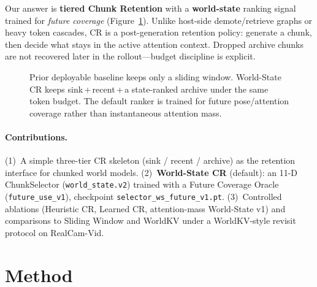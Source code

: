 \documentclass{article}
\newcommand{\method}{World-State CR}
\begin{document}
Our answer is \textbf{tiered Chunk Retention} with a
\textbf{world-state} ranking signal trained for \emph{future coverage}
(Figure~\ref{fig:overview}).  Unlike host-side demote/retrieve graphs or
heavy token cascades, CR is a post-generation retention policy: generate a
chunk, then decide what stays in the active attention context.  Dropped
archive chunks are not recovered later in the rollout---budget discipline
is explicit.

\begin{figure}[t]
  \centering
  \caption{Prior deployable baseline keeps only a sliding window.
  \method{} keeps sink\,+\,recent\,+\,a state-ranked archive under the same
  token budget.  The default ranker is trained for future pose/attention
  coverage rather than instantaneous attention mass.}
  \label{fig:overview}
\end{figure}

\paragraph{Contributions.}
(1)~A simple three-tier CR skeleton (sink / recent / archive) as the
retention interface for chunked world models.
(2)~\textbf{World-State CR} (default): an 11-D ChunkSelector
(\texttt{world\_state.v2}) trained with a Future Coverage Oracle
(\texttt{future\_use\_v1}), checkpoint \texttt{selector\_ws\_future\_v1.pt}.
(3)~Controlled ablations (Heuristic CR, Learned CR, attention-mass
World-State v1) and comparisons to Sliding Window and WorldKV under a
WorldKV-style revisit protocol on RealCam-Vid.

\section{Method}
\label{sec:method}
\end{document}
